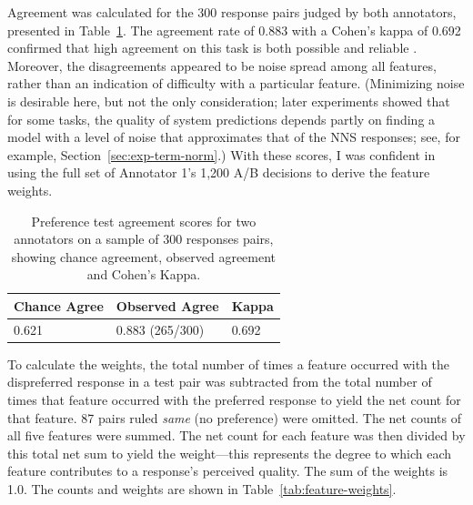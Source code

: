 Agreement was calculated for the 300 response pairs judged by both annotators, presented in Table~\ref{tab:preference-agreement}. The agreement rate of 0.883 with a Cohen's kappa of 0.692 confirmed that high agreement on this task is both possible and reliable \citep{landis1977measurement, artstein:massimo:2008}. Moreover, the disagreements appeared to be noise spread among all features, rather than an indication of difficulty with a particular feature. (Minimizing noise is desirable here, but not the only consideration; later experiments showed that for some tasks, the quality of system predictions depends partly on finding a model with a level of noise that approximates that of the NNS responses; see, for example, Section~\ref{sec:exp-term-norm}.) With these scores, I was confident in using the full set of Annotator 1's 1,200 A/B decisions to derive the feature weights. 

\begin{table}[htb!]
\begin{center}
\begin{tabular}{|l|l|l|}
\hline
 Chance Agree & Observed Agree & Kappa \\
\hline
0.621 & 0.883 (265/300) & 0.692 \\
\hline
\end{tabular}
\caption{\label{tab:preference-agreement} Preference test agreement scores for two annotators on a sample of 300 responses pairs, showing chance agreement, observed agreement and Cohen's Kappa.}
\end{center}
\end{table}

To calculate the weights, the total number of times a feature occurred with the dispreferred response in a test pair was subtracted from the total number of times that feature occurred with the preferred response to yield the net count for that feature. 87 pairs ruled \textit{same} (no preference) were omitted. The net counts of all five features were summed. The net count for each feature was then divided by this total net sum to yield the weight---this represents the degree to which each feature contributes to a response's perceived quality. The sum of the weights is 1.0. The counts and weights are shown in Table~\ref{tab:feature-weights}.

